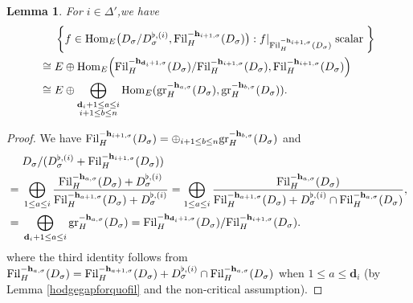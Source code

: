 \documentclass[10pt]{article}
\newtheorem{lem}[thm]{Lemma}
\newcommand{\fil}{{\rm Fil}}
\newcommand{\homo}{{\rm Hom}}
\newcommand{\gr}{{\rm gr}}
\newcommand{\bh}{{\mathbf{h}}}
\newcommand{\bd}{{\mathbf{d}}}
\begin{document}
\begin{lem}\label{filforhomospace}
For $i\in \Delta'$,\;we have 
	\begin{equation*}
	\begin{aligned}
&\;\left\{f\in\homo_E\big(D_{\sigma}/D_{\sigma}^{\flat,(i)},\fil_H^{-\bh_{i+1,\sigma}}(D_{\sigma})\big):f|_{\fil_H^{-\bh_{i+1,\sigma}}(D_{\sigma})} \text{\;scalar\;}\right\}\\\cong&\; E\oplus \homo_E\Big(\fil_H^{-\bh_{\bd_i+1,\sigma}}(D_{\sigma})/\fil_H^{-\bh_{i+1,\sigma}}(D_{\sigma}),\fil_H^{-\bh_{i+1,\sigma}}(D_{\sigma})\Big)\\\cong&\;E\oplus\bigoplus_{\substack{\bd_i+1\leq a\leq i\\i+1\leq b\leq n}}\homo_E(\gr_H^{-\bh_{a,\sigma}}(D_{\sigma}),\gr_H^{-\bh_{b,\sigma}}(D_{\sigma})).\;
	\end{aligned}
\end{equation*}
\end{lem}
\begin{proof}We have $\fil_H^{-\bh_{i+1,\sigma}}(D_{\sigma})=\oplus_{i+1\leq b\leq n}\gr_H^{-\bh_{b,\sigma}}(D_{\sigma})$ and 
\begin{equation*}
\begin{aligned}
	&\;D_{\sigma}/(D_{\sigma}^{\flat,(i)}+\fil_H^{-\bh_{i+1,\sigma}}(D_{\sigma}))\\
	=&\;\bigoplus_{1\leq a\leq i}\frac{\fil_H^{-\bh_{a,\sigma}}(D_{\sigma})+D_{\sigma}^{\flat,(i)}}{\fil_H^{-\bh_{a+1,\sigma}}(D_{\sigma})+D_{\sigma}^{\flat,(i)}}=\bigoplus_{1\leq a\leq i}\frac{\fil_H^{-\bh_{a,\sigma}}(D_{\sigma})}{\fil_H^{-\bh_{a+1,\sigma}}(D_{\sigma})+D_{\sigma}^{\flat,(i)}\cap \fil_H^{-\bh_{a,\sigma}}(D_{\sigma})},\\
	=&\;\bigoplus_{\bd_i+1\leq a\leq i}\gr_H^{-\bh_{a,\sigma}}(D_{\sigma})=\fil_H^{-\bh_{\bd_i+1,\sigma}}(D_{\sigma})/\fil_H^{-\bh_{i+1,\sigma}}(D_{\sigma}).\;
\end{aligned}
\end{equation*}
where the third identity follows from ${\fil_H^{-\bh_{a,\sigma}}(D_{\sigma})=\fil_H^{-\bh_{a+1,\sigma}}(D_{\sigma})+D_{\sigma}^{\flat,(i)}\cap \fil_H^{-\bh_{a,\sigma}}}(D_{\sigma})$ when $1\leq a\leq \bd_i$ (by Lemma \ref{hodgegapforquofil} and the non-critical assumption).\;
\end{proof}
\end{document}
